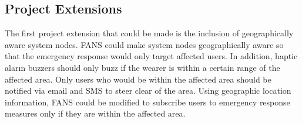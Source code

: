 \subsection{Project Extensions}

The first project extension that could be made is the inclusion of geographically aware system nodes. FANS could make 
system nodes geographically aware so that the emergency response would only target affected users. In addition, 
haptic alarm buzzers should only buzz if the wearer is within a certain range of the affected area. Only users who would 
be within the affected area should be notified via email and SMS to steer clear of the area. Using geographic location 
information, FANS could be modified to subscribe users to emergency response measures only if they are within the affected area.
